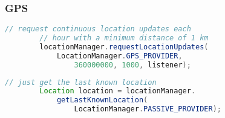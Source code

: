 \begin{frame}[fragile]
	\frametitle{GPS}
	\begin{lstlisting}[language=Java]
		// request continuous location updates each
		// hour with a minimum distance of 1 km 
		locationManager.requestLocationUpdates(
		    LocationManager.GPS_PROVIDER,
		        360000000, 1000, listener);
    \end{lstlisting}
    \pause
	\begin{lstlisting}[language=Java]
		// just get the last known location
		Location location = locationManager.
		    getLastKnownLocation(
		        LocationManager.PASSIVE_PROVIDER);
    \end{lstlisting}    
\end{frame}







